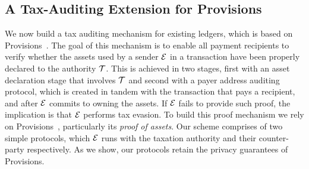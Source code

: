 \subsection{A Tax-Auditing Extension for Provisions}\label{sec:provisions-extension}

We now build a tax auditing mechanism for existing ledgers, which is based on
Provisions~\cite{CCS:DBBCB15}. The goal of this mechanism is to enable all payment recipients to verify whether the assets used by a sender $\mathcal{E}$ in a transaction have been
properly declared to the authority $\mathcal{T}$. This is achieved in two stages, first with an asset declaration stage that involves $\mathcal{T}$ and second with a payer address auditing protocol, which is created
in tandem with the transaction that pays a recipient,
and after $\mathcal{E}$ commits to owning the assets. If $\mathcal{E}$ fails to provide such proof, the implication is that $\mathcal{E}$ performs tax evasion.
To build this proof mechanism we rely on Provisions~\cite{CCS:DBBCB15},
particularly its \emph{proof of assets}. Our scheme comprises of two simple
protocols, which $\mathcal{E}$ runs with the taxation authority and their
counter-party respectively. As we show, our protocols retain the privacy
guarantees of Provisions.

